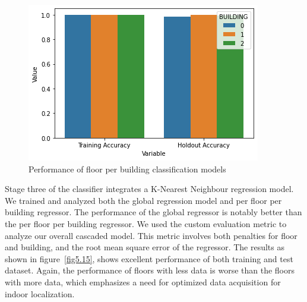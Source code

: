 \documentclass[a4paper,singleside,12pt]{report} %
\begin{document}
			\begin{figure}[!htb]
				\centering
				\includegraphics[width=0.8\linewidth]{./figures/best_local_floor.png}
				\caption{Performance of floor per building classification models}
				 \label{fig5.14}
			\end{figure}
			
			
			
			Stage three of the classifier integrates a K-Nearest Neighbour regression model. We trained and analyzed both the global regression model and per floor per building regressor. 
			The performance of the global regressor is notably better than the per floor per building regressor. 
			We used the custom evaluation metric to analyze our overall cascaded model. 
			This metric involves both penalties for floor and building, and the root mean square error of the regressor. 
			The results as shown in figure~\ref{fig5.15}, shows excellent performance of both training and test dataset. 
			Again, the performance of floors with less data is worse than the floors with more data, which emphasizes a need for optimized data acquisition for indoor localization.
			
\end{document}
